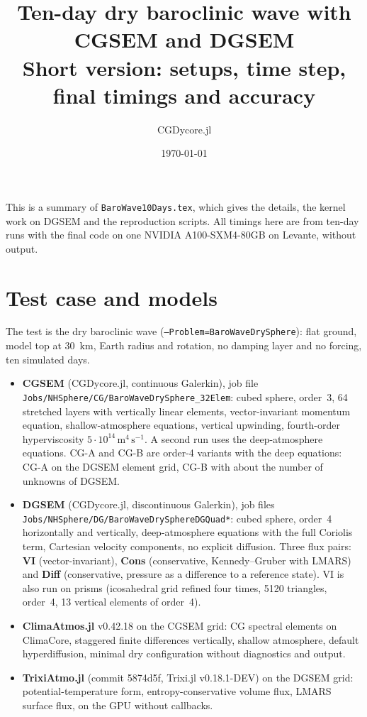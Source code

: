\documentclass[11pt,a4paper]{article}
\title{Ten-day dry baroclinic wave with CGSEM and DGSEM\\[0.3em]
\large Short version: setups, time step, final timings and accuracy}
\author{CGDycore.jl}
\date{\today}
\newcommand{\code}[1]{\texttt{#1}}
\begin{document}
\sloppy
\maketitle

\noindent This is a summary of \code{BaroWave10Days.tex}, which gives the
details, the kernel work on DGSEM and the reproduction scripts. All timings
here are from ten-day runs with the final code on one NVIDIA A100-SXM4-80GB
on Levante, without output.

\section{Test case and models}

The test is the dry baroclinic wave (\code{--Problem=BaroWaveDrySphere}):
flat ground, model top at 30~km, Earth radius and rotation, no damping
layer and no forcing, ten simulated days.

\begin{itemize}
\item \textbf{CGSEM} (CGDycore.jl, continuous Galerkin), job file
  \code{Jobs/NHSphere/CG/BaroWaveDrySphere\_32Elem}: cubed sphere,
  order~3, 64 stretched layers with vertically linear elements,
  vector-invariant momentum equation, shallow-atmosphere equations,
  vertical upwinding, fourth-order hyperviscosity
  $5\cdot10^{14}\,\mathrm{m^4\,s^{-1}}$. A second run uses the
  deep-atmosphere equations. CG-A and CG-B are order-4 variants with the
  deep equations: CG-A on the DGSEM element grid, CG-B with about the
  number of unknowns of DGSEM.
\item \textbf{DGSEM} (CGDycore.jl, discontinuous Galerkin), job files
  \code{Jobs/NHSphere/DG/BaroWaveDrySphereDGQuad*}: cubed sphere,
  order~4 horizontally and vertically, deep-atmosphere equations with the
  full Coriolis term, Cartesian velocity components, no explicit
  diffusion. Three flux pairs: \textbf{VI} (vector-invariant),
  \textbf{Cons} (conservative, Kennedy--Gruber with LMARS) and
  \textbf{Diff} (conservative, pressure as a difference to a reference
  state). VI is also run on prisms (icosahedral grid refined four times,
  5120 triangles, order~4, 13 vertical elements of order~4).
\item \textbf{ClimaAtmos.jl} v0.42.18 on the CGSEM grid: CG spectral
  elements on ClimaCore, staggered finite differences vertically, shallow
  atmosphere, default hyperdiffusion, minimal dry configuration without
  diagnostics and output.
\item \textbf{TrixiAtmo.jl} (commit 5874d5f, Trixi.jl v0.18.1-DEV) on the
  DGSEM grid: potential-temperature form, entropy-conservative volume flux,
  LMARS surface flux, on the GPU without callbacks.
\end{itemize}
\end{document}
